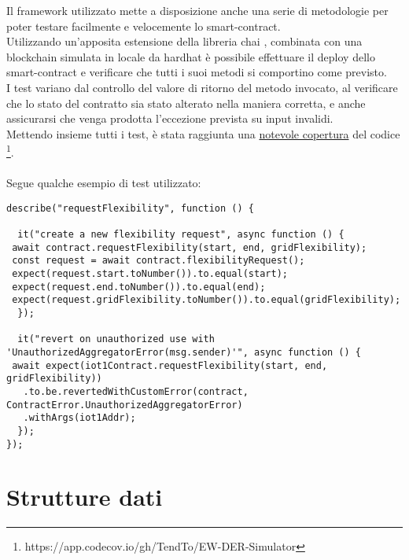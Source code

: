 Il framework utilizzato mette a disposizione anche una serie di metodologie per poter testare facilmente e velocemente lo \gls{smart-contract}. \\
Utilizzando un'apposita estensione della libreria chai \cite{sftw:chai}, combinata con una blockchain simulata in locale da hardhat
è possibile effettuare il deploy dello \gls{smart-contract} e verificare che tutti i suoi metodi si comportino come previsto. \\
I test variano dal controllo del valore di ritorno del metodo invocato, al verificare che lo stato del contratto sia stato alterato nella maniera corretta,
e anche assicurarsi che venga prodotta l'eccezione prevista su input invalidi. \\
Mettendo insieme tutti i test, è stata raggiunta una \href{https://app.codecov.io/gh/TendTo/EW-DER-Simulator}{notevole copertura} del codice \footnote{https://app.codecov.io/gh/TendTo/EW-DER-Simulator}. \\
\\
Segue qualche esempio di test utilizzato:
\begin{verbatim}
describe("requestFlexibility", function () {

  it("create a new flexibility request", async function () {
 await contract.requestFlexibility(start, end, gridFlexibility);
 const request = await contract.flexibilityRequest();
 expect(request.start.toNumber()).to.equal(start);
 expect(request.end.toNumber()).to.equal(end);
 expect(request.gridFlexibility.toNumber()).to.equal(gridFlexibility);
  });

  it("revert on unauthorized use with 'UnauthorizedAggregatorError(msg.sender)'", async function () {
 await expect(iot1Contract.requestFlexibility(start, end, gridFlexibility))
   .to.be.revertedWithCustomError(contract, ContractError.UnauthorizedAggregatorError)
   .withArgs(iot1Addr);
  });
});
\end{verbatim}

\section{Strutture dati}

